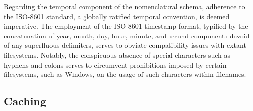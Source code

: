 Regarding the temporal component of the nomenclatural schema, adherence to the
ISO-8601 standard, a globally ratified temporal convention, is deemed
imperative. The employment of the ISO-8601 timestamp format, typified by the
concatenation of year, month, day, hour, minute, and second components devoid of
any superfluous delimiters, serves to obviate compatibility issues with extant
filesystems. Notably, the conspicuous absence of special characters such as
hyphens and colons serves to circumvent prohibitions imposed by certain
filesystems, such as Windows, on the usage of such characters within filenames.


\subsection{Caching}

